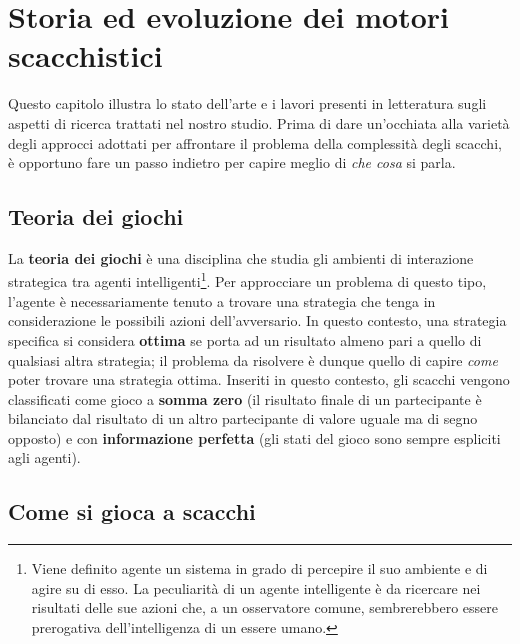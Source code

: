 \chapter{Storia ed evoluzione dei motori scacchistici} %
%
\begin{citazione}
    Questo capitolo illustra lo stato dell'arte e i lavori presenti in letteratura sugli aspetti di ricerca trattati nel nostro studio. 
    Prima di dare un'occhiata alla varietà degli approcci adottati per affrontare il problema della complessità degli scacchi, 
    è opportuno fare un passo indietro per capire meglio di \textit{che cosa} si parla.
\end{citazione}

\section{Teoria dei giochi}
La \textbf{teoria dei giochi} è una disciplina che studia gli ambienti di interazione strategica tra
agenti intelligenti\footnote{Viene definito agente un sistema in grado di percepire il suo ambiente e di agire su di esso. La peculiarità
di un agente intelligente è da ricercare nei risultati delle sue azioni che, a un osservatore comune, sembrerebbero essere prerogativa
dell'intelligenza di un essere umano.}. Per approcciare un problema di questo tipo, l'agente è necessariamente tenuto a trovare
una strategia che tenga in considerazione le possibili azioni dell'avversario. In questo contesto, una strategia specifica si considera
\textbf{ottima} se porta ad un risultato almeno pari a quello di qualsiasi altra strategia; il problema da risolvere è dunque 
quello di capire \textit{come} poter trovare una strategia ottima. Inseriti in questo contesto,
gli scacchi vengono classificati come gioco a \textbf{somma zero} (il risultato finale di un partecipante
è bilanciato dal risultato di un altro partecipante di valore uguale ma di segno opposto) e con \textbf{informazione perfetta} (gli stati
del gioco sono sempre espliciti agli agenti).

\section{Come si gioca a scacchi}

